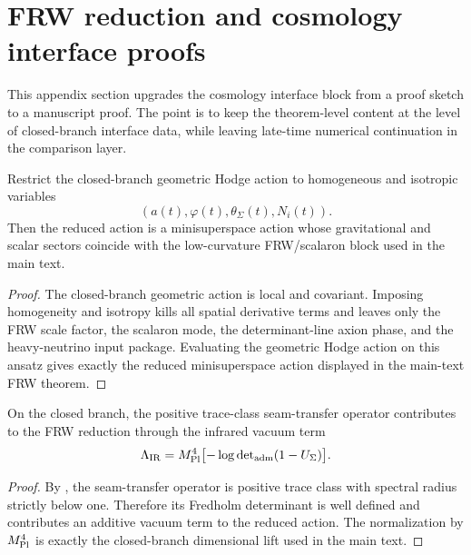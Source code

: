 \section{FRW reduction and cosmology interface proofs}
\label{app:frw-interface-proofs}

This appendix section upgrades the cosmology interface block from a proof sketch to a manuscript
proof. The point is to keep the theorem-level content at the level of closed-branch interface data,
while leaving late-time numerical continuation in the comparison layer.

\begin{lemma}
\label{lem:minisuperspace-reduction-hodge-branch}
Restrict the closed-branch geometric Hodge action to homogeneous and isotropic variables
\[
(a(t),\varphi(t),\theta_\Sigma(t),N_i(t)).
\]
Then the reduced action is a minisuperspace action whose gravitational and scalar sectors coincide
with the low-curvature FRW/scalaron block used in the main text.
\end{lemma}

\begin{proof}
The closed-branch geometric action is local and covariant. Imposing homogeneity and isotropy kills
all spatial derivative terms and leaves only the FRW scale factor, the scalaron mode, the
determinant-line axion phase, and the heavy-neutrino input package. Evaluating the geometric Hodge
action on this ansatz gives exactly the reduced minisuperspace action displayed in the main-text FRW
theorem.
\end{proof}

\begin{lemma}
\label{lem:seam-transfer-vacuum-term}
On the closed branch, the positive trace-class seam-transfer operator contributes to the FRW
reduction through the infrared vacuum term
\[
\Lambda_{\mathrm{IR}}
=
M_{\mathrm{Pl}}^4\bigl[-\log\det\nolimits_{\mathrm{adm}}(1-U_\Sigma)\bigr].
\]
\end{lemma}

\begin{proof}
By , the seam-transfer operator is positive trace class with spectral
radius strictly below one. Therefore its Fredholm determinant is well defined and contributes an
additive vacuum term to the reduced action. The normalization by $M_{\mathrm{Pl}}^4$ is exactly the
closed-branch dimensional lift used in the main text.
\end{proof}

